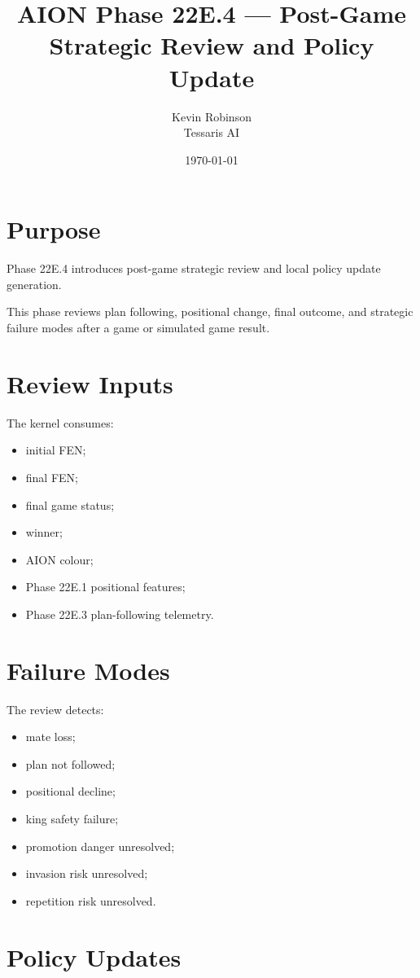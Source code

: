\documentclass[11pt,a4paper]{article}
\title{\textbf{AION Phase 22E.4 --- Post-Game Strategic Review and Policy Update}}
\author{Kevin Robinson\\Tessaris AI}
\date{\today}
\begin{document}
\maketitle

\section{Purpose}

Phase 22E.4 introduces post-game strategic review and local policy update generation.

This phase reviews plan following, positional change, final outcome, and strategic failure modes after a game or simulated game result.

\section{Review Inputs}

The kernel consumes:

\begin{itemize}[leftmargin=*]
  \item initial FEN;
  \item final FEN;
  \item final game status;
  \item winner;
  \item AION colour;
  \item Phase 22E.1 positional features;
  \item Phase 22E.3 plan-following telemetry.
\end{itemize}

\section{Failure Modes}

The review detects:

\begin{itemize}[leftmargin=*]
  \item mate loss;
  \item plan not followed;
  \item positional decline;
  \item king safety failure;
  \item promotion danger unresolved;
  \item invasion risk unresolved;
  \item repetition risk unresolved.
\end{itemize}

\section{Policy Updates}
\end{document}
